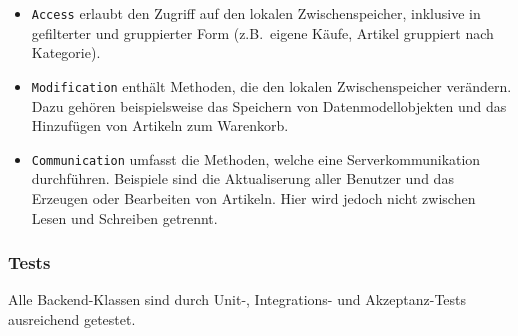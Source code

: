 \begin{itemize}
	\item \texttt{Access} erlaubt den Zugriff auf den lokalen Zwischenspeicher, inklusive in gefilterter und gruppierter Form (z.B.\ eigene Käufe, Artikel gruppiert nach Kategorie).
	\item \texttt{Modification} enthält Methoden, die den lokalen Zwischenspeicher verändern.
	Dazu gehören beispielsweise das Speichern von Datenmodellobjekten und das Hinzufügen von Artikeln zum Warenkorb.
	\item \texttt{Communication} umfasst die Methoden, welche eine Serverkommunikation durchführen.
	Beispiele sind die Aktualiserung aller Benutzer und das Erzeugen oder Bearbeiten von Artikeln.
	Hier wird jedoch nicht zwischen Lesen und Schreiben getrennt.
\end{itemize}


\subsubsection{Tests}

Alle Backend-Klassen sind durch Unit-, Integrations- und Akzeptanz-Tests ausreichend getestet.
